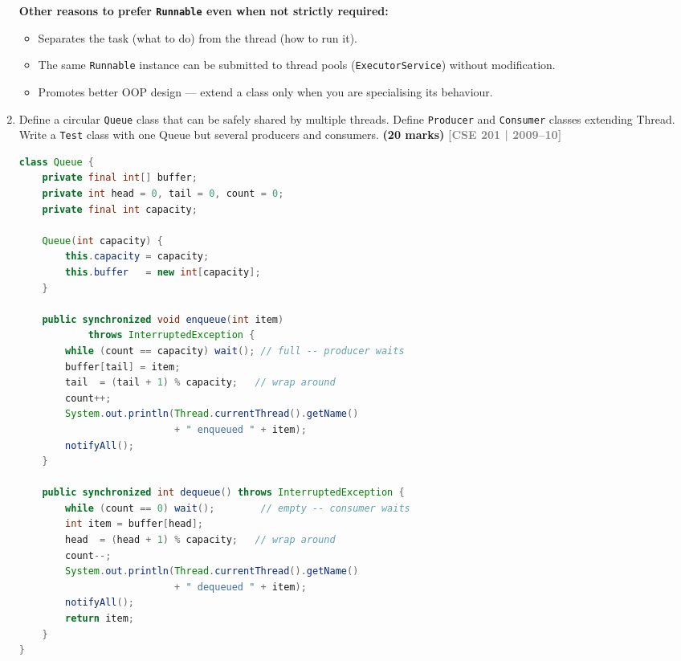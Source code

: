 \documentclass[12pt,a3paper]{article}
\newcommand{\yr}[1]{\hfill\textcolor{gray}{\small\textbf{[#1]}}}
\newcommand{\mk}[1]{\textcolor{orange!70!black}{\small\textbf{(#1 marks)}}}
\begin{document}
\begin{enumerate}
\begin{tcolorbox}[enhanced,breakable,ansbox,
  colback=cF!4,colframe=cF,boxrule=0.8pt,arc=5pt,
  title={\textbf{Answer — When \texttt{Runnable} is Mandatory}},
  fonttitle=\bfseries\color{white},colbacktitle=cF]
\textbf{Other reasons to prefer \texttt{Runnable} even when not strictly
required:}
\begin{itemize}[itemsep=2pt]
  \item Separates the task (what to do) from the thread (how to run it).
  \item The same \texttt{Runnable} instance can be submitted to thread
    pools (\texttt{ExecutorService}) without modification.
  \item Promotes better OOP design — extend a class only when you are
    specialising its behaviour.
\end{itemize}

\end{tcolorbox}

\item Define a circular \texttt{Queue} class that can be safely shared by multiple threads. Define \texttt{Producer} and \texttt{Consumer} classes extending Thread. Write a \texttt{Test} class with one Queue but several producers and consumers. \mk{20}
\yr{CSE 201 | 2009--10}

\begin{tcolorbox}[enhanced,breakable,ansbox,
  colback=cF!4,colframe=cF,boxrule=0.8pt,arc=5pt,
  title={\textbf{Answer --- Thread-Safe Circular Queue with Multiple Producers \& Consumers}},
  fonttitle=\bfseries\color{white},colbacktitle=cF]

\begin{lstlisting}[language=Java]
class Queue {
    private final int[] buffer;
    private int head = 0, tail = 0, count = 0;
    private final int capacity;

    Queue(int capacity) {
        this.capacity = capacity;
        this.buffer   = new int[capacity];
    }

    public synchronized void enqueue(int item)
            throws InterruptedException {
        while (count == capacity) wait(); // full -- producer waits
        buffer[tail] = item;
        tail  = (tail + 1) % capacity;   // wrap around
        count++;
        System.out.println(Thread.currentThread().getName()
                           + " enqueued " + item);
        notifyAll();
    }

    public synchronized int dequeue() throws InterruptedException {
        while (count == 0) wait();        // empty -- consumer waits
        int item = buffer[head];
        head  = (head + 1) % capacity;   // wrap around
        count--;
        System.out.println(Thread.currentThread().getName()
                           + " dequeued " + item);
        notifyAll();
        return item;
    }
}


\end{lstlisting}
\end{tcolorbox}
\end{enumerate}
\end{document}
